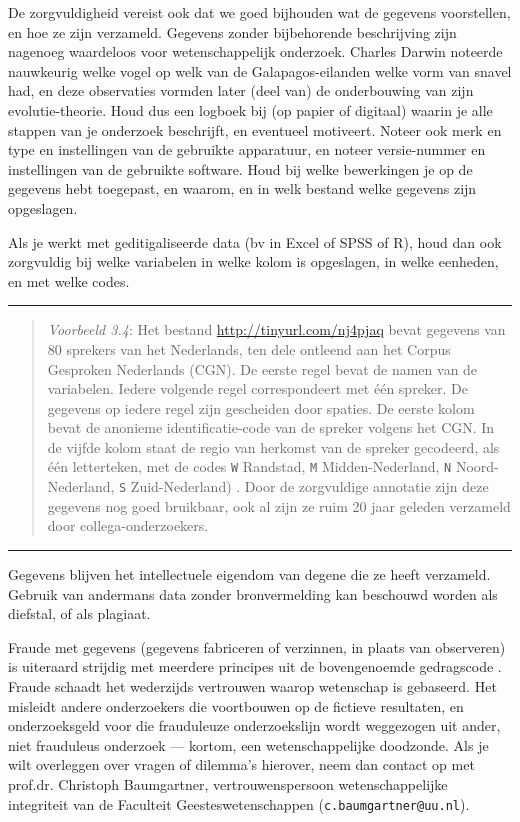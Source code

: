 \documentclass[
]{book}
\begin{document}
De zorgvuldigheid vereist ook dat we goed bijhouden wat de gegevens
voorstellen, en hoe ze zijn verzameld. Gegevens zonder bijbehorende
beschrijving zijn nagenoeg waardeloos voor wetenschappelijk onderzoek.
Charles Darwin noteerde nauwkeurig welke vogel op welk van de
Galapagos-eilanden welke vorm van snavel had, en deze observaties
vormden later (deel van) de onderbouwing van zijn evolutie-theorie. Houd
dus een logboek bij (op papier of digitaal) waarin je alle stappen van
je onderzoek beschrijft, en eventueel motiveert. Noteer ook merk en type
en instellingen van de gebruikte apparatuur, en noteer versie-nummer en
instellingen van de gebruikte software. Houd bij welke bewerkingen je op
de gegevens hebt toegepast, en waarom, en in welk bestand welke gegevens
zijn opgeslagen.

Als je werkt met geditigaliseerde data (bv in Excel of SPSS of R), houd
dan ook zorgvuldig bij welke variabelen in welke kolom is opgeslagen, in
welke eenheden, en met welke codes.

\begin{center}\rule{0.5\linewidth}{0.5pt}\end{center}

\begin{quote}
\emph{Voorbeeld 3.4}: Het
bestand \url{http://tinyurl.com/nj4pjaq} bevat gegevens van 80 sprekers van
het Nederlands, ten dele ontleend aan het Corpus Gesproken Nederlands
(CGN). De eerste regel bevat de namen van de variabelen. Iedere volgende
regel correspondeert met één spreker. De gegevens op iedere regel zijn
gescheiden door spaties. De eerste kolom bevat de anonieme
identificatie-code van de spreker volgens het CGN. In de vijfde kolom
staat de regio van herkomst van de spreker gecodeerd, als één
letterteken, met de codes \texttt{W} Randstad, \texttt{M} Midden-Nederland, \texttt{N}
Noord-Nederland, \texttt{S} Zuid-Nederland) \citep{Quene08}. Door de zorgvuldige
annotatie zijn deze gegevens nog goed bruikbaar, ook al zijn ze ruim 20
jaar geleden verzameld door collega-onderzoekers.
\end{quote}

\begin{center}\rule{0.5\linewidth}{0.5pt}\end{center}

Gegevens blijven het intellectuele eigendom van degene die ze heeft
verzameld. Gebruik van andermans data zonder bronvermelding kan
beschouwd worden als diefstal, of als plagiaat.

Fraude met gegevens (gegevens fabriceren of verzinnen, in plaats van
observeren) is uiteraard strijdig met meerdere principes uit de
bovengenoemde gedragscode \citep{VSNU18}. Fraude schaadt het wederzijds
vertrouwen waarop wetenschap is gebaseerd. Het misleidt andere
onderzoekers die voortbouwen op de fictieve resultaten, en
onderzoeksgeld voor die frauduleuze onderzoekslijn wordt weggezogen uit
ander, niet frauduleus onderzoek --- kortom, een wetenschappelijke
doodzonde. Als je wilt overleggen over vragen of dilemma's hierover,
neem dan contact op met prof.dr. Christoph Baumgartner, vertrouwenspersoon
wetenschappelijke integriteit van de Faculteit Geesteswetenschappen
(\texttt{c.baumgartner@uu.nl}).
\end{document}
